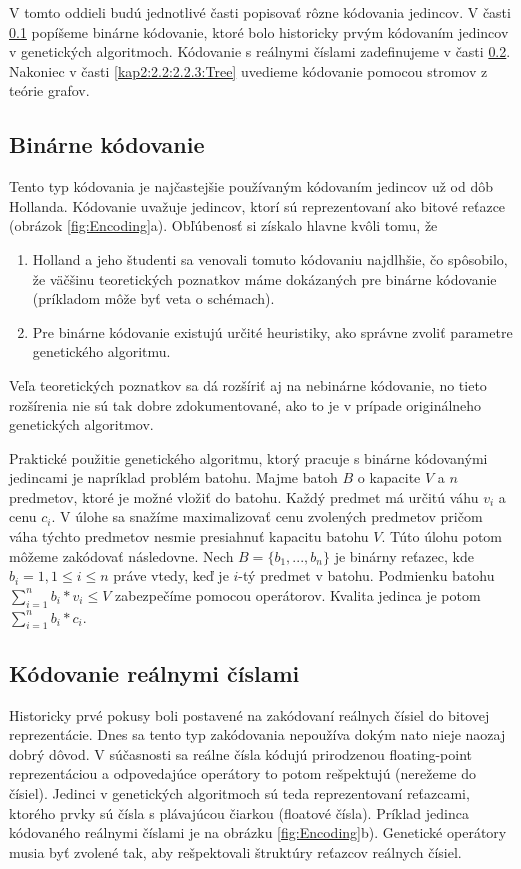 V tomto oddieli budú jednotlivé časti popisovať rôzne kódovania jedincov. V časti \ref{kap2:2.2:2.2.1:Binary} popíšeme binárne kódovanie, ktoré bolo historicky prvým kódovaním jedincov v genetických algoritmoch. Kódovanie s reálnymi číslami zadefinujeme v časti \ref{kap2:2.2:2.2.2:RealValued}. Nakoniec v časti \ref{kap2:2.2:2.2.3:Tree} uvedieme kódovanie pomocou stromov z teórie grafov.
\subsection{Binárne kódovanie}\label{kap2:2.2:2.2.1:Binary}
Tento typ kódovania je najčastejšie používaným kódovaním jedincov už od dôb Hollanda. Kódovanie uvažuje jedincov, ktorí sú reprezentovaní ako bitové reťazce (obrázok \ref{fig:Encoding}a). Obľúbenosť si získalo hlavne kvôli tomu, že 
\begin{enumerate}
\item Holland a jeho študenti sa venovali tomuto kódovaniu najdlhšie, čo spôsobilo, že väčšinu teoretických poznatkov máme dokázaných pre binárne kódovanie (príkladom môže byť veta o schémach).
\item Pre binárne kódovanie existujú určité heuristiky, ako správne zvoliť parametre genetického algoritmu.
\end{enumerate}
Veľa teoretických poznatkov sa dá rozšíriť aj na nebinárne kódovanie, no tieto rozšírenia nie sú tak dobre zdokumentované, ako to je v prípade originálneho genetických algoritmov.

Praktické použitie genetického algoritmu, ktorý pracuje s binárne kódovanými jedincami je napríklad problém batohu. Majme batoh $B$ o kapacite $V$ a $n$ predmetov, ktoré je možné vložiť do batohu. Každý predmet má určitú váhu $v_i$ a cenu $c_i$. V úlohe sa snažíme maximalizovať cenu zvolených predmetov pričom váha týchto predmetov nesmie presiahnuť kapacitu batohu $V$. Túto úlohu potom môžeme zakódovať následovne. Nech $B=\{b_1,...,b_n\}$ je binárny reťazec, kde $b_i = 1, 1 \leq i \leq n$ práve vtedy, keď je $i$-tý predmet v batohu. Podmienku batohu $\sum_{i=1}^{n} b_i * v_i \leq V$ zabezpečíme pomocou operátorov. Kvalita jedinca je potom $\sum_{i=1}^{n} b_i * c_i$.
\subsection{Kódovanie reálnymi číslami}\label{kap2:2.2:2.2.2:RealValued}
Historicky prvé pokusy boli postavené na zakódovaní reálnych čísiel do bitovej reprezentácie. Dnes sa tento typ zakódovania nepoužíva dokým nato nieje naozaj dobrý dôvod. V súčasnosti sa reálne čísla kódujú prirodzenou floating-point reprezentáciou a odpovedajúce operátory to potom rešpektujú (nerežeme do čísiel). Jedinci v genetických algoritmoch sú teda reprezentovaní reťazcami, ktorého prvky sú čísla s plávajúcou čiarkou (floatové čísla).
Príklad jedinca kódovaného reálnymi číslami je na obrázku \ref{fig:Encoding}b). Genetické operátory musia byť zvolené tak, aby rešpektovali štruktúry reťazcov reálnych čísiel.

